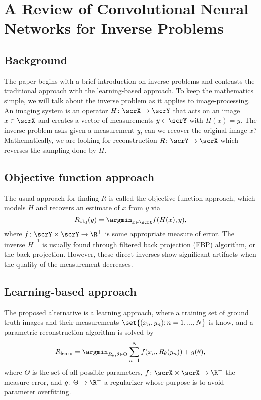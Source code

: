 \section{A Review of Convolutional Neural Networks for Inverse Problems}
\subsection{Background}
The paper begins with a brief introduction on inverse problems and contrasts the
traditional approach with the learning-based approach. To keep the mathematics
simple, we will talk about the inverse problem as it applies to
image-processing. An imaging system is an operator $H\colon\scrX\to\scrY$ that
acts on an image $x\in\scrX$ and creates a vector of measurements $y\in\scrY$
with $H(x)=y$. The inverse problem asks given a measurement $y$, can we recover
the original image $x$? Mathematically, we are looking for reconstruction
$R\colon\scrY\to\scrX$ which reverses the sampling done by $H$.

\subsection{Objective function approach}
The usual approach for finding $R$ is called the objective function approach,
which models $H$ and recovers an estimate of $x$ from $y$ via
\begin{equation}
  \label{eq:sum-2:obj-fun-app}
  R_{\text{obj}}(y)=\argmin_{x\in\scrX}f(H(x),y),
\end{equation}
where $f\colon\scrY\times\scrY\to\R^+$ is some appropriate measure of error. The
inverse $\bar H^{-1}$ is usually found through filtered back projection (FBP)
algorithm, or the back projection. However, these direct inverses show
significant artifacts when the quality of the measurement decreases.

\subsection{Learning-based approach}
The proposed alternative is a learning approach, where a training set of ground
truth images and their measurements $\set{(x_n,y_n);n=1,...,N}$ is know, and a
parametric reconstruction algorithm is solved by
\begin{equation}
  \label{eq:sum-2:param-rec-alg}
  R_{\text{learn}}=\argmin_{R_\theta,\theta\in\Theta}\sum_{n=1}^N f(x_n,R_\theta(y_n))+g(\theta),
\end{equation}
where $\Theta$ is the set of all possible parameters,
$f\colon\scrX\times\scrX\to\R^+$ the measure error, and $g\colon\Theta\to\R^+$ a
regularizer whose purpose is to avoid parameter overfitting.

